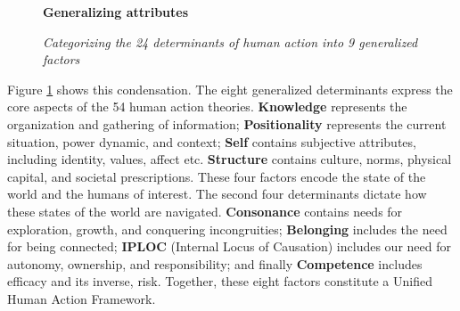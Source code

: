 \documentclass[12 pt]{article}
\begin{document}
 \begin{figure}
 	\centering
 	\textbf{Generalizing attributes}\par \medskip
 
 	\caption{\textit{Categorizing the 24 determinants of human action into 9 generalized factors}}
 		\label{fig:unif}
 \end{figure}

 Figure \ref{fig:unif} shows this condensation. The eight generalized determinants express the core aspects of the 54 human action theories. \textbf{Knowledge} represents the organization and gathering of information; \textbf{Positionality} represents the current situation, power dynamic, and context; \textbf{Self} contains subjective attributes, including identity, values, affect etc. \textbf{Structure} contains culture, norms, physical capital, and societal prescriptions. These four factors encode the state of the world and the humans of interest. The second four determinants dictate how these states of the world are navigated. \textbf{Consonance} contains needs for exploration, growth, and conquering incongruities; \textbf{Belonging} includes the need for being connected; \textbf{IPLOC} (Internal Locus of Causation) includes our need for autonomy, ownership, and responsibility; and finally \textbf{Competence} includes efficacy and its inverse, risk. Together, these eight factors constitute a Unified Human Action Framework. 
 
\end{document}
